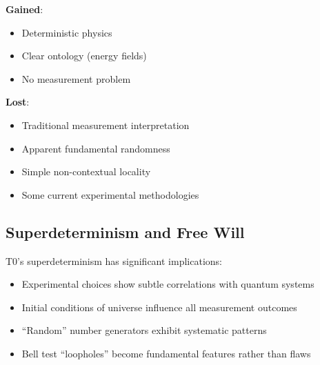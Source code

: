 	\begin{tcolorbox}[colback=purple!5!white,colframe=purple!75!black,title=Philosophical Trade-offs]
		\textbf{Gained}:
		\begin{itemize}
			\item Deterministic physics
			\item Clear ontology (energy fields)
			\item No measurement problem
		\end{itemize}
		
		\textbf{Lost}:
		\begin{itemize}
			\item Traditional measurement interpretation
			\item Apparent fundamental randomness
			\item Simple non-contextual locality
			\item Some current experimental methodologies
		\end{itemize}
	\end{tcolorbox}
	
	\subsection{Superdeterminism and Free Will}
	
	T0's superdeterminism has significant implications:
	
	\begin{itemize}
		\item Experimental choices show subtle correlations with quantum systems
		\item Initial conditions of universe influence all measurement outcomes
		\item ``Random'' number generators exhibit systematic patterns
		\item Bell test ``loopholes'' become fundamental features rather than flaws
	\end{itemize}
